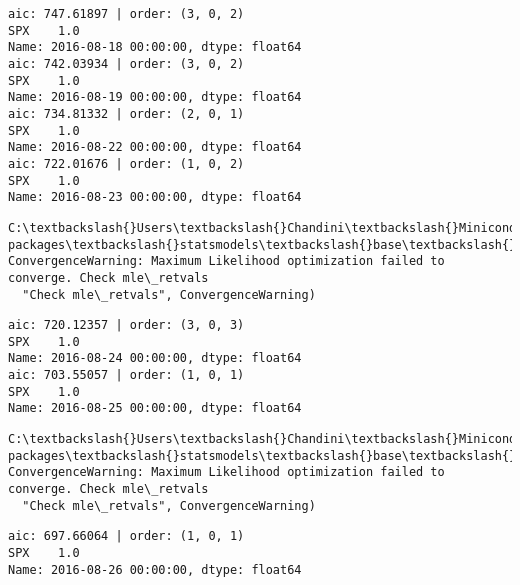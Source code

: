\documentclass[11pt]{article}
\begin{document}
    \begin{Verbatim}[commandchars=\\\{\}]
aic: 747.61897 | order: (3, 0, 2)
SPX    1.0
Name: 2016-08-18 00:00:00, dtype: float64
aic: 742.03934 | order: (3, 0, 2)
SPX    1.0
Name: 2016-08-19 00:00:00, dtype: float64
aic: 734.81332 | order: (2, 0, 1)
SPX    1.0
Name: 2016-08-22 00:00:00, dtype: float64
aic: 722.01676 | order: (1, 0, 2)
SPX    1.0
Name: 2016-08-23 00:00:00, dtype: float64

    \end{Verbatim}

    \begin{Verbatim}[commandchars=\\\{\}]
C:\textbackslash{}Users\textbackslash{}Chandini\textbackslash{}Miniconda3\textbackslash{}envs\textbackslash{}auquan\textbackslash{}lib\textbackslash{}site-packages\textbackslash{}statsmodels\textbackslash{}base\textbackslash{}model.py:496: ConvergenceWarning: Maximum Likelihood optimization failed to converge. Check mle\_retvals
  "Check mle\_retvals", ConvergenceWarning)

    \end{Verbatim}

    \begin{Verbatim}[commandchars=\\\{\}]
aic: 720.12357 | order: (3, 0, 3)
SPX    1.0
Name: 2016-08-24 00:00:00, dtype: float64
aic: 703.55057 | order: (1, 0, 1)
SPX    1.0
Name: 2016-08-25 00:00:00, dtype: float64

    \end{Verbatim}

    \begin{Verbatim}[commandchars=\\\{\}]
C:\textbackslash{}Users\textbackslash{}Chandini\textbackslash{}Miniconda3\textbackslash{}envs\textbackslash{}auquan\textbackslash{}lib\textbackslash{}site-packages\textbackslash{}statsmodels\textbackslash{}base\textbackslash{}model.py:496: ConvergenceWarning: Maximum Likelihood optimization failed to converge. Check mle\_retvals
  "Check mle\_retvals", ConvergenceWarning)

    \end{Verbatim}

    \begin{Verbatim}[commandchars=\\\{\}]
aic: 697.66064 | order: (1, 0, 1)
SPX    1.0
Name: 2016-08-26 00:00:00, dtype: float64

    \end{Verbatim}
\end{document}
